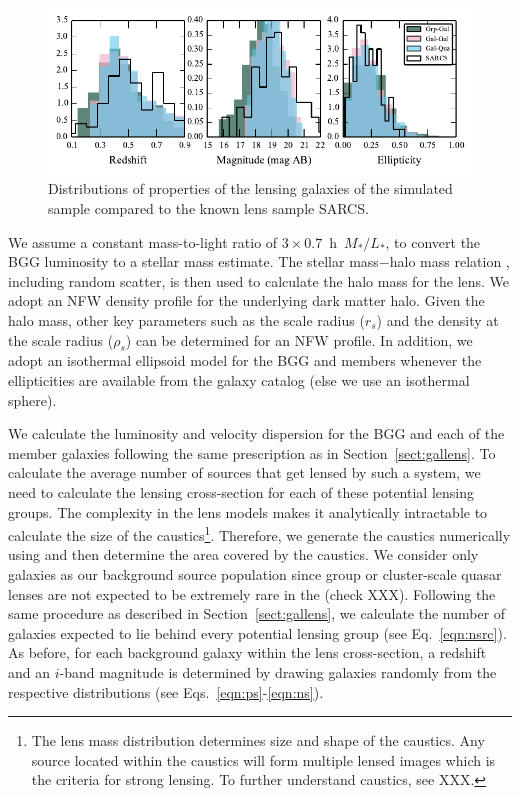 \documentclass[useAMS,usenatbib,a4paper]{mn2e}
\begin{document}
\begin{figure}
\begin{center}
\includegraphics[scale=1.3]{sw-cfhtls-figs/lensprop.pdf}
\caption{ \label{fig:lensprop}
Distributions of properties of the lensing galaxies of the simulated
sample compared to the known lens sample SARCS. %
}
\end{center}
\end{figure}

We assume a constant mass-to-light ratio of $3 \times 0.7$~h~$M_{*}/L_{*}$, to
convert the BGG luminosity to a stellar mass estimate. The stellar mass$-$halo
mass relation \citep{Behroozi2013}, including random scatter, is then used to
calculate the halo mass for the lens. We adopt an NFW density profile for the
underlying dark matter halo. Given the halo mass, other key parameters such as
the scale radius ($r_s$) and the density at the scale radius ($\rho_s$) can be
determined for an NFW profile. In addition, we adopt an isothermal ellipsoid
model for the BGG and members whenever the ellipticities are available from the
galaxy catalog (else we use an isothermal sphere).

We calculate the luminosity and velocity dispersion for the BGG and each of the
member galaxies following the same prescription as in
Section~\ref{sect:gallens}. To calculate the average number of sources that get
lensed by such a system, we need to calculate the lensing cross-section for each
of these potential lensing groups. The complexity in the lens models makes it
analytically intractable to calculate the size of the caustics\footnote{The lens
mass distribution determines size and shape of the caustics. Any source
located within the caustics will form multiple lensed images which is the
criteria for strong lensing. To further understand caustics, see XXX.}.
Therefore, we generate the caustics numerically using \gravlens and then
determine the area covered by the caustics. We consider only galaxies as our
background source population since group or cluster-scale quasar lenses are not
expected to be extremely rare in the \cfhtls (check XXX).  Following the same procedure
as described in Section~\ref{sect:gallens}, we calculate the number of galaxies
expected to lie behind every potential lensing group (see Eq.~\ref{eqn:nsrc}).
As before, for each background galaxy within the lens cross-section, a redshift
and an $i$-band magnitude is determined by drawing galaxies randomly from the
respective distributions (see Eqs.~\ref{eqn:ps}-\ref{eqn:ns}).
\end{document}
